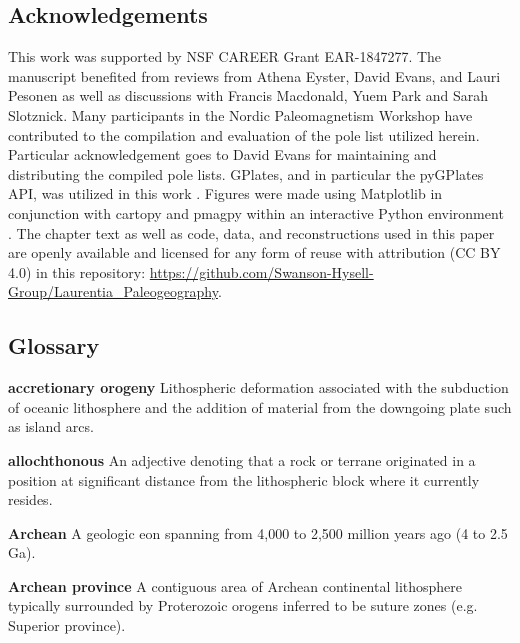 \documentclass[twocolumn, switch]{article} %
\begin{document}

\footnotesize
\subsection*{Acknowledgements}
This work was supported by NSF CAREER Grant EAR-1847277. The manuscript benefited from reviews from Athena Eyster, David Evans, and Lauri Pesonen as well as discussions with Francis Macdonald, Yuem Park and Sarah Slotznick. Many participants in the Nordic Paleomagnetism Workshop have contributed to the compilation and evaluation of the pole list utilized herein. Particular acknowledgement goes to David Evans for maintaining and distributing the compiled pole lists. GPlates, and in particular the pyGPlates API, was utilized in this work \citep{Muller2018b}. Figures were made using Matplotlib \citep{Hunter2007a} in conjunction with cartopy \citep{Met-Office2010a} and pmagpy \citep{Tauxe2016a} within an interactive Python environment \citep{Perez2007a}.   The chapter text as well as code, data, and reconstructions used in this paper are openly available and licensed for any form of reuse with attribution (CC BY 4.0)  in this repository: \url{https://github.com/Swanson-Hysell-Group/Laurentia_Paleogeography}.

\subsection*{Glossary}
\noindent\textbf{accretionary orogeny } Lithospheric deformation associated with the subduction of oceanic lithosphere and the addition of material from the downgoing plate such as island arcs.

\noindent\textbf{allochthonous } An adjective denoting that a rock or terrane originated in a position at significant distance from the lithospheric block where it currently resides.

\noindent\textbf{Archean } A geologic eon spanning from 4,000 to 2,500 million years ago (4 to 2.5 Ga).

\noindent\textbf{Archean province } A contiguous area of Archean continental lithosphere typically surrounded by Proterozoic orogens inferred to be suture zones (e.g. Superior province).
\end{document}
